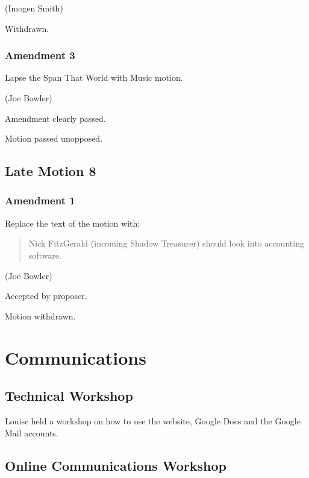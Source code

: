\documentclass[a4paper, 11pt]{article} %
\begin{document}
(Imogen Smith)

Withdrawn.

\subsubsection{Amendment 3}
Lapse the Span That World with Music motion.

(Joe Bowler)

Amendment clearly passed.

Motion passed unopposed.

\subsection{Late Motion 8}
\subsubsection{Amendment 1}
Replace the text of the motion with:

\begin{quote}
Nick FitzGerald (incoming Shadow Treasurer) should look into accounting software.
\end{quote}

(Joe Bowler)

Accepted by proposer.

Motion withdrawn.

\section{Communications}
\subsection{Technical Workshop}
Louise held a workshop on how to use the website, Google Docs and the Google Mail accounts.

\subsection{Online Communications Workshop}
\end{document}
